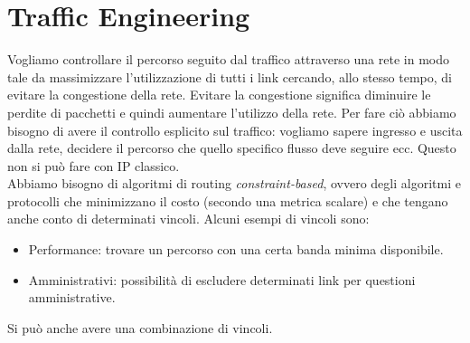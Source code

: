 \documentclass{article}
\begin{document}
\section{Traffic Engineering}
Vogliamo controllare il percorso seguito dal traffico attraverso una rete in modo tale da massimizzare l'utilizzazione di tutti i link cercando, allo stesso tempo, di evitare la congestione della rete. Evitare la congestione significa diminuire le perdite di pacchetti e quindi aumentare l'utilizzo della rete. Per fare ciò abbiamo bisogno di avere il controllo esplicito sul traffico: vogliamo sapere ingresso e uscita dalla rete, decidere il percorso che quello specifico flusso deve seguire ecc. Questo non si può fare con IP classico.\\
Abbiamo bisogno di algoritmi di routing \textit{constraint-based}, ovvero degli algoritmi e protocolli che minimizzano il costo (secondo una metrica scalare) e che tengano anche conto di determinati vincoli. Alcuni esempi di vincoli sono:
\begin{itemize}
    \item Performance: trovare un percorso con una certa banda minima disponibile.
    \item Amministrativi: possibilità di escludere determinati link per questioni amministrative.
\end{itemize}
Si può anche avere una combinazione di vincoli.\\
\end{document}
